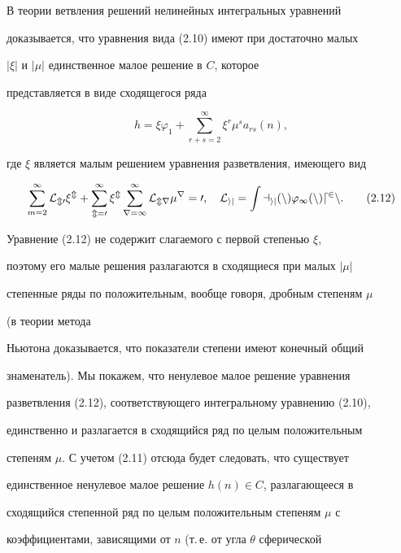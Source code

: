 В теории ветвления решений нелинейных интегральных уравнений \cite{2}


доказывается, что уравнения вида (2.10) имеют при достаточно малых


$|\xi|$ и $|\mu|$ единственное малое решение в $C$, которое


представляется в виде сходящегося ряда


\begin{equation}


h=\xi\varphi_1+\sum^\infty_{r+s=2}\xi^r\mu^s a_{rs}(n),


\tag{2.11}


\end{equation}


где $\xi$ является малым решением уравнения разветвления, имеющего вид


\begin{equation}


\sum^\infty_{m=2}\cal L_{m0}\xi^m+


\sum^\infty_{m=0}\xi^m\sum^\infty_{r=1}\cal L_{mr}\mu^r=0,\quad


\cal L_{ij}=\int a_{ij}(n)\varphi_1(n)d^2n.


\tag{2.12}


\end{equation}


Уравнение (2.12) не содержит слагаемого с первой степенью $\xi$,


поэтому его малые решения разлагаются в сходящиеся при малых $|\mu|$


степенные ряды по положительным, вообще говоря, дробным степеням $\mu$


(в теории метода


Ньютона доказывается, что показатели степени имеют конечный общий


знаменатель). Мы покажем, что ненулевое малое решение уравнения


разветвления (2.12), соответствующего интегральному уравнению (2.10),


единственно и разлагается в сходящийся ряд по целым положительным


степеням $\mu$. С учетом (2.11) отсюда будет следовать, что существует


единственное ненулевое малое решение $h(n)\in C$, разлагающееся в


сходящийся степенной ряд по целым положительным степеням $\mu$ с


коэффициентами, зависящими от $n$ (т.\,е. от угла $\theta$ сферической


